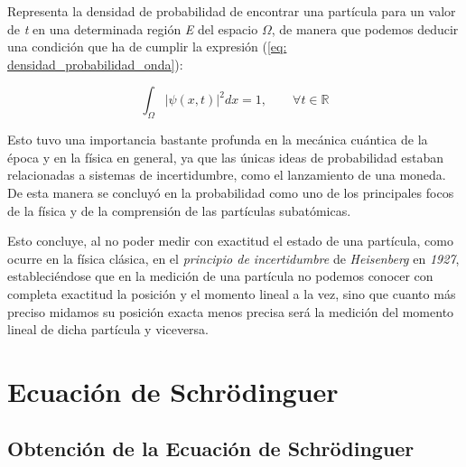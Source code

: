 \documentclass{article}
\numberwithin{equation}{section} %
\begin{document}
        \vspace{5mm}

        Representa la densidad de probabilidad de encontrar una partícula para un valor de \textit{t} en una determinada región \textit{E} del espacio \( \Omega \), de manera que podemos deducir una condición que ha de cumplir la expresión (\ref{eq: densidad_probabilidad_onda}):
        
        \vspace{5mm}

        \begin{equation}
            \int_{\Omega} \lvert \psi(x, t) \rvert ^ {2} dx = 1, \qquad \forall t \in \mathbb{R}
        \end{equation}

        \vspace{5mm}
        
        Esto tuvo una importancia bastante profunda en la mecánica cuántica de la época y en la física en general, ya que las únicas ideas de probabilidad estaban relacionadas a sistemas de incertidumbre, como el lanzamiento de una moneda. De esta manera se concluyó en la probabilidad como uno de los principales focos de la física y de la comprensión de las partículas subatómicas.

        \vspace{5mm}

        Esto concluye, al no poder medir con exactitud el estado de una partícula, como ocurre en la física clásica, en el \textit{principio de incertidumbre} de \textit{Heisenberg} en \textit{1927}, estableciéndose que en la medición de una partícula no podemos conocer con completa exactitud la posición y el momento lineal a la vez, sino que cuanto más preciso midamos su posición exacta menos precisa será la medición del momento lineal de dicha partícula y viceversa.

    \vspace{5mm}

    \section{Ecuación de Schrödinguer}

    \subsection{Obtención de la Ecuación de Schrödinguer}

    \vspace{5mm}
\end{document}
